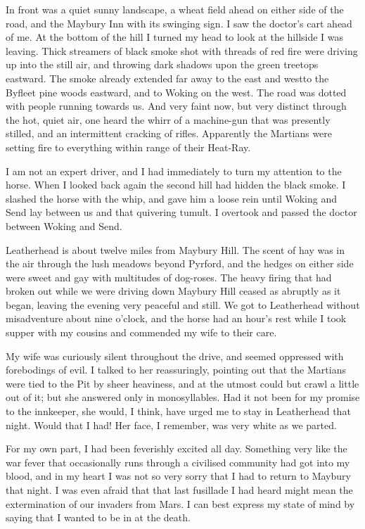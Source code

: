 In front was a quiet sunny landscape, a wheat field ahead on either
side of the road, and the Maybury Inn with its swinging sign. I saw
the doctor's cart ahead of me. At the bottom of the hill I turned
my head to look at the hillside I was leaving. Thick streamers of
black smoke shot with threads of red fire were driving up into the
still air, and throwing dark shadows upon the green treetops
eastward. The smoke already extended far away to the east and
west\dash{}to the Byfleet pine woods eastward, and to Woking on the
west. The road was dotted with people running towards us. And very
faint now, but very distinct through the hot, quiet air, one heard
the whirr of a machine-gun that was presently stilled, and an
intermittent cracking of rifles. Apparently the Martians were
setting fire to everything within range of their Heat-Ray.

I am not an expert driver, and I had immediately to turn my
attention to the horse. When I looked back again the second hill
had hidden the black smoke. I slashed the horse with the whip, and
gave him a loose rein until Woking and Send lay between us and that
quivering tumult. I overtook and passed the doctor between Woking
and Send.

Leatherhead is about twelve miles from Maybury Hill. The scent of
hay was in the air through the lush meadows beyond Pyrford, and the
hedges on either side were sweet and gay with multitudes of
dog-roses. The heavy firing that had broken out while we were
driving down Maybury Hill ceased as abruptly as it began, leaving
the evening very peaceful and still. We got to Leatherhead without
misadventure about nine o'clock, and the horse had an hour's rest
while I took supper with my cousins and commended my wife to their
care.

My wife was curiously silent throughout the drive, and seemed
oppressed with forebodings of evil. I talked to her reassuringly,
pointing out that the Martians were tied to the Pit by sheer
heaviness, and at the utmost could but crawl a little out of it;
but she answered only in monosyllables. Had it not been for my
promise to the innkeeper, she would, I think, have urged me to stay
in Leatherhead that night. Would that I had! Her face, I remember,
was very white as we parted.

For my own part, I had been feverishly excited all day. Something
very like the war fever that occasionally runs through a civilised
community had got into my blood, and in my heart I was not so very
sorry that I had to return to Maybury that night. I was even afraid
that that last fusillade I had heard might mean the extermination
of our invaders from Mars. I can best express my state of mind by
saying that I wanted to be in at the death.


